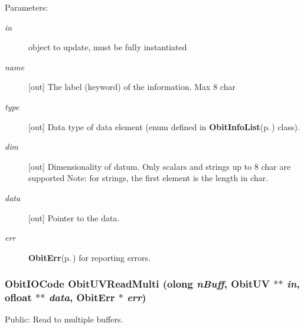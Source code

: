 \begin{Desc}
\item[Parameters:]
\begin{description}
\item[{\em in}]object to update, must be fully instantiated \item[{\em name}][out] The label (keyword) of the information. Max 8 char \item[{\em type}][out] Data type of data element (enum defined in {\bf Obit\-Info\-List}{\rm (p.\,\pageref{structObitInfoList})} class). \item[{\em dim}][out] Dimensionality of datum. Only scalars and strings up to 8 char are supported Note: for strings, the first element is the length in char. \item[{\em data}][out] Pointer to the data. \item[{\em err}]{\bf Obit\-Err}{\rm (p.\,\pageref{structObitErr})} for reporting errors. \end{description}
\end{Desc}
\subsubsection{\setlength{\rightskip}{0pt plus 5cm}Obit\-IOCode Obit\-UVRead\-Multi ({\bf olong} {\em n\-Buff}, {\bf Obit\-UV} $\ast$$\ast$ {\em in}, {\bf ofloat} $\ast$$\ast$ {\em data}, {\bf Obit\-Err} $\ast$ {\em err})}\label{ObitUV_8h_a38}


Public: Read to multiple buffers. 

